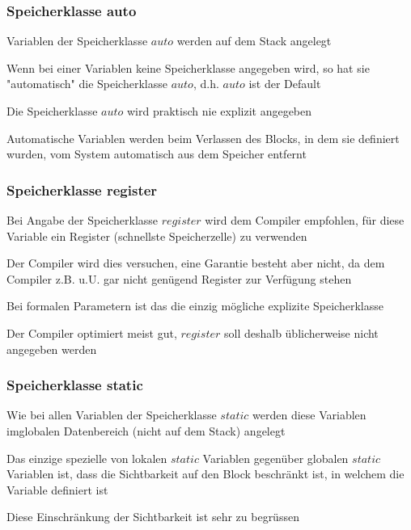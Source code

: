 				\subsubsection{Speicherklasse auto}
					\begin{compactitem}
						\item Variablen der Speicherklasse $auto$ werden auf dem Stack angelegt
						\item Wenn bei einer Variablen keine Speicherklasse angegeben wird, so hat sie
						"automatisch" die Speicherklasse $auto$, d.h. $auto$ ist der Default
						\item Die Speicherklasse $auto$ wird praktisch nie explizit angegeben 
						\item Automatische Variablen werden beim Verlassen des Blocks, in dem sie
						definiert wurden, vom System automatisch aus dem Speicher entfernt
					\end{compactitem}
				\subsubsection{Speicherklasse register}
					\begin{compactitem}
						\item Bei Angabe der Speicherklasse $register$ wird dem Compiler empfohlen, für
						diese Variable ein Register (schnellste Speicherzelle) zu verwenden
						\item Der Compiler wird dies versuchen, eine Garantie besteht aber nicht, da dem
						Compiler z.B. u.U. gar nicht genügend Register zur Verfügung stehen
						\item Bei formalen Parametern ist das die einzig mögliche explizite Speicherklasse
						\item Der Compiler optimiert meist gut, $register$ soll deshalb üblicherweise nicht
						angegeben werden
					\end{compactitem}				
				\subsubsection{Speicherklasse static}
					\begin{compactitem}
						\item Wie bei allen Variablen der Speicherklasse $static$ werden diese Variablen imglobalen Datenbereich (nicht auf dem Stack) angelegt
						\item Das einzige spezielle von lokalen $static$ Variablen gegenüber globalen 
						$static$ Variablen ist, dass die Sichtbarkeit auf den Block beschränkt ist, in
						welchem die Variable definiert ist
						\item Diese Einschränkung der Sichtbarkeit ist sehr zu begrüssen
					\end{compactitem}	
					
